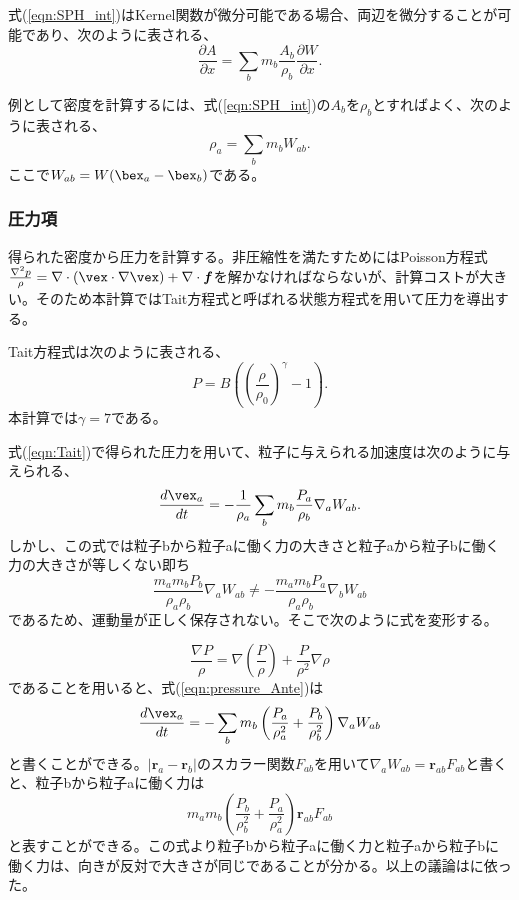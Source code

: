 \documentclass[]{jsarticle}
\begin{document}
式(\ref{eqn:SPH_int})はKernel関数が微分可能である場合、両辺を微分することが可能であり、次のように表される、
\begin{equation}
\frac{\partial A}{\partial x}=\sum_bm_b\frac{A_b}{\rho_b}\frac{\partial W}{\partial x}.
\end{equation}

例として密度を計算するには、式(\ref{eqn:SPH_int})の$A_b$を$\rho_b$とすればよく、次のように表される、
\begin{equation}
\rho_{a}=\sum_bm_bW_{ab}.
\end{equation}
ここで$W_{ab}=W(\bex_a-\bex_b)$である。

\subsubsection{圧力項}
得られた密度から圧力を計算する。非圧縮性を満たすためにはPoisson方程式$\frac{\nabla^2p}{\rho}=\nabla\cdot(\vex\cdot\nabla\vex)+\nabla \cdot \bm{f}$を解かなければならないが、計算コストが大きい。そのため本計算ではTait方程式と呼ばれる状態方程式を用いて圧力を導出する。

Tait方程式は次のように表される、
\begin{equation}
  \label{eqn:Tait}
  P=B\left(
 \left(\frac{\rho}{\rho_0}\right)^\gamma-1
    \right).
\end{equation}
本計算では$\gamma=7$である。

式(\ref{eqn:Tait})で得られた圧力を用いて、粒子に与えられる加速度は次のように与えられる、
\begin{equation}
  \label{eqn:pressure_Ante}
\frac{d\vex_a}{dt}=-\frac{1}{\rho_a}\sum_bm_b\frac{P_a}{\rho_b}\nabla_aW_{ab}.
\end{equation}
しかし、この式では粒子bから粒子aに働く力の大きさと粒子aから粒子bに働く力の大きさが等しくない即ち
\begin{equation}
\frac{m_am_bP_b}{\rho_a\rho_b}\nabla_aW_{ab} \neq -\frac{m_am_bP_a}{\rho_a\rho_b}\nabla_bW_{ab}
\end{equation}
であるため、運動量が正しく保存されない。そこで次のように式を変形する。

\begin{equation}
\frac{\nabla P}{\rho}=\nabla \left(\frac{P}{\rho}\right)+\frac{P}{\rho^2}\nabla \rho
\end{equation}
であることを用いると、式(\ref{eqn:pressure_Ante})は
\begin{equation}
\frac{d\vex_a}{dt}=-\sum_bm_b\left(\frac{P_a}{\rho_a^2}+\frac{P_b}{\rho_b^2}\right)\nabla_aW_{ab}
\end{equation}
と書くことができる。$|\bm{r}_a-\bm{r}_b|$のスカラー関数$F_{ab}$を用いて$\nabla_aW_{ab}=\bm{r}_{ab}F_{ab}$と書くと、粒子bから粒子aに働く力は
\begin{equation}
m_am_b\left(\frac{P_b}{\rho_b^2}+\frac{P_a}{\rho_a^2}\right)\bm{r}_{ab}F_{ab}
\end{equation}
と表すことができる。この式より粒子bから粒子aに働く力と粒子aから粒子bに働く力は、向きが反対で大きさが同じであることが分かる。以上の議論は\cite{Monaghan2005}に依った。
\end{document}
